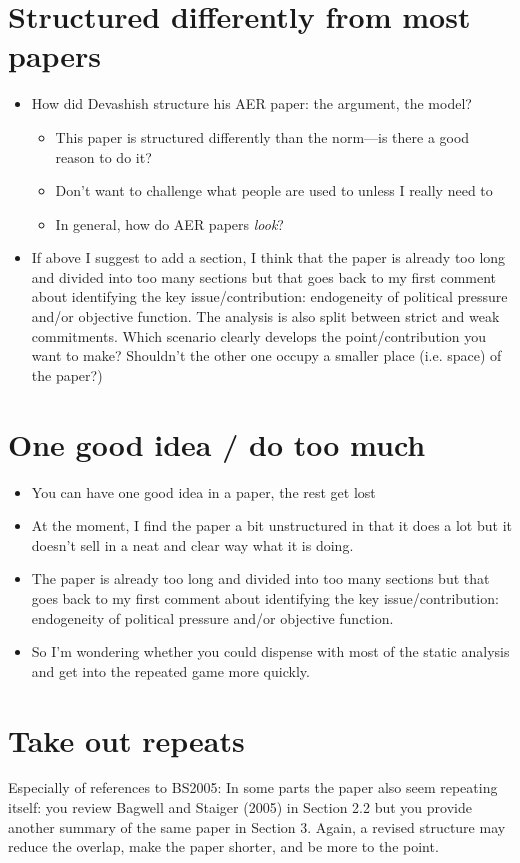 \documentclass[12pt]{article}
\begin{document}
\section{Structured differently from most papers}
		\begin{itemize}
			\item How did Devashish structure his AER paper: the argument, the model?
				\begin{itemize}
					\item This paper is structured differently than the norm---is there a good reason to do it?
					\item Don't want to challenge what people are used to unless I really need to
					\item In general, how do AER papers \textit{look}?
				\end{itemize}
			\item If above I suggest to add a section, I think that the paper is already too long and divided into too many sections but that goes back to my first comment about identifying the key issue/contribution: endogeneity of political pressure and/or objective function. The analysis is also split between strict and weak commitments. Which scenario clearly develops the point/contribution you want to make? Shouldn't the other one occupy a smaller place (i.e. space) of the paper?)
		\end{itemize}


\section{One good idea / do too much}
		\begin{itemize}
			\item You can have one good idea in a paper, the rest get lost
			\item At the moment, I find the paper a bit unstructured in that it does a lot but it doesn't sell in a neat and clear way what it is doing.
			\item The paper is already too long and divided into too many sections but that goes back to my first comment about identifying the key issue/contribution: endogeneity of political pressure and/or objective function.
			\item So I'm wondering whether you could dispense with most of the static analysis and get into the repeated game more quickly.
		\end{itemize}


\section{Take out repeats}
	Especially of references to BS2005: In some parts the paper also seem repeating itself: you review Bagwell and Staiger (2005) in Section 2.2 but you provide another summary of the same paper in Section 3. Again, a revised structure may reduce the overlap, make the paper shorter, and be more to the point.
	
\end{document}
